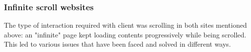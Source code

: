 \subsubsection{Infinite scroll websites}
The type of interaction required with client was scrolling in both sites mentioned above: an "infinite" page kept loading contents progressively while being scrolled. This led to various issues that have been faced and solved in different ways. 